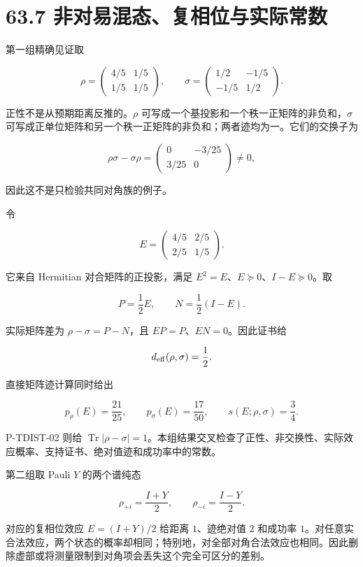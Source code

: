\documentclass[
  11pt,
  oneside]{book}
\begin{document}
\section{63.7 非对易混态、复相位与实际常数}

第一组精确见证取

\[
\rho=\begin{pmatrix}4/5&1/5\\1/5&1/5\end{pmatrix},
\qquad
\sigma=\begin{pmatrix}1/2&-1/5\\-1/5&1/2\end{pmatrix}.
\]

正性不是从预期距离反推的。\(\rho\)
可写成一个基投影和一个秩一正矩阵的非负和，\(\sigma\)
可写成正单位矩阵和另一个秩一正矩阵的非负和；两者迹均为一。它们的交换子为

\[
\rho\sigma-\sigma\rho
=\begin{pmatrix}0&-3/25\\3/25&0\end{pmatrix}\ne0,
\]

因此这不是只检验共同对角族的例子。

令

\[
E=\begin{pmatrix}4/5&2/5\\2/5&1/5\end{pmatrix}.
\]

它来自 Hermitian 对合矩阵的正投影，满足
\(E^2=E\)、\(E\succeq0\)、\(I-E\succeq0\)。取

\[
P=\frac12E,\qquad N=\frac12(I-E).
\]

实际矩阵差为 \(\rho-\sigma=P-N\)，且 \(EP=P\)、\(EN=0\)。因此证书给

\[
d_{\rm eff}(\rho,\sigma)=\frac12.
\]

直接矩阵迹计算同时给出

\[
p_\rho(E)=\frac{21}{25},
\qquad
p_\sigma(E)=\frac{17}{50},
\qquad
s(E;\rho,\sigma)=\frac34.
\]

P-TDIST-02 则给
\(\operatorname{Tr}|\rho-\sigma|=1\)。本组结果交叉检查了正性、非交换性、实际效应概率、支持证书、绝对值迹和成功率中的常数。

第二组取 Pauli \(Y\) 的两个谱纯态

\[
\rho_{+i}=\frac{I+Y}{2},
\qquad
\rho_{-i}=\frac{I-Y}{2}.
\]

对应的复相位效应 \(E=(I+Y)/2\) 给距离 \(1\)、迹绝对值 \(2\) 和成功率
\(1\)。对任意实合法效应，两个状态的概率却相同；特别地，对全部对角合法效应也相同。因此删除虚部或将测量限制到对角项会丢失这个完全可区分的差别。
\end{document}
